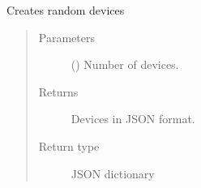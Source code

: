 \documentclass[letterpaper,10pt,english]{sphinxmanual}
\begin{document}
\begin{fulllineitems}

\begin{fulllineitems}
\label{\detokenize{CE_app.synth_phr:CE_app.synth_phr.functions.Domains.device}}
\sphinxAtStartPar
Creates random devices
\begin{quote}\begin{description}
\item[{Parameters}] \leavevmode
\sphinxAtStartPar
{} () \textendash{} Number of devices.

\item[{Returns}] \leavevmode
\sphinxAtStartPar
Devices in JSON format.

\item[{Return type}] \leavevmode
\sphinxAtStartPar
JSON dictionary

\end{description}\end{quote}

\end{fulllineitems}



\end{fulllineitems}
\end{document}
